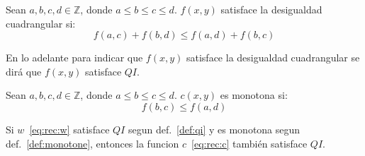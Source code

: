 \documentclass[spanish]{llncs}
\newcommand*{\Z}{\mathds{Z}}
\begin{document}
\begin{definition}
	\label{def:qi}
	Sean $a,b,c,d \in \Z$, donde $a \le b \le c \le d$. $f(x,y)$ satisface
	la desigualdad cuadrangular si:
	\begin{equation*}
		f(a,c) + f(b,d) \le f(a,d) + f(b,c)
	\end{equation*}
\end{definition}

En lo adelante para indicar que $f(x,y)$ satisface la desigualdad cuadrangular
se dirá que $f(x,y)$ satisface $QI$.

\begin{definition}
	\label{def:monotone}
	Sean $a,b,c,d \in \Z$, donde $a \le b \le c \le d$. $c(x,y)$ es
	monotona si:
	\begin{equation*}
		f(b,c) \le f(a,d)
	\end{equation*}
\end{definition}

\begin{lemma}
	\label{lemma:qi:1}
	Si $w$~\eqref{eq:rec:w} satisface $QI$ segun def.~\ref{def:qi} y es monotona segun
	def.~\ref{def:monotone}, entonces la funcion $c$~\eqref{eq:rec:c}
	también satisface $QI$.
\end{lemma}
\end{document}
